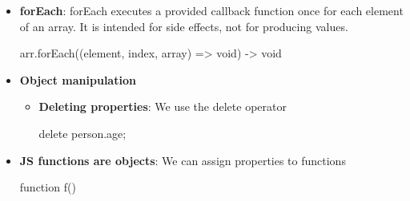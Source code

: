 \documentclass{report}
\begin{document}
\begin{itemize}
\begin{itemize}
                            \bigbreak \noindent 
                            \begin{jscode}
                            arr.map((element, index, array) => newElement) -> Array
                            \end{jscode}
                        \item \textbf{Filter}: filter selects a subset of elements based on a predicate function and returns a new array containing only those elements for which the predicate evaluates to true.
                            \bigbreak \noindent 
                            \begin{jscode}
                            arr.filter((element, index, array) => boolean) -> Array
                            \end{jscode}
                        \item \textbf{Reduce}: reduce aggregates an array into a single value by repeatedly combining elements using an accumulator function. It is the most general of the three operations.
                            \bigbreak \noindent 
                            \begin{jscode}
                                arr.reduce((accumulator, element, index, array) => newAccumulator, initialValue) -> any
                            \end{jscode}
                    \end{itemize}
                \item \textbf{forEach}: forEach executes a provided callback function once for each element of an array. It is intended for side effects, not for producing values.
                    \bigbreak \noindent 
                    \begin{jscode}
                    arr.forEach((element, index, array) => void) -> void
                    \end{jscode}
                \item \textbf{Object manipulation}
                    \begin{itemize}
                        \item \textbf{Deleting properties}: We use the delete operator
                            \bigbreak \noindent 
                            \begin{jscode}
                            delete person.age;
                            \end{jscode}
                    \end{itemize}
                \item \textbf{JS functions are objects}: We can assign properties to functions
                    \bigbreak \noindent 
                    \begin{jscode}
                    function f() {}


\end{jscode}
\end{itemize}
\end{document}
